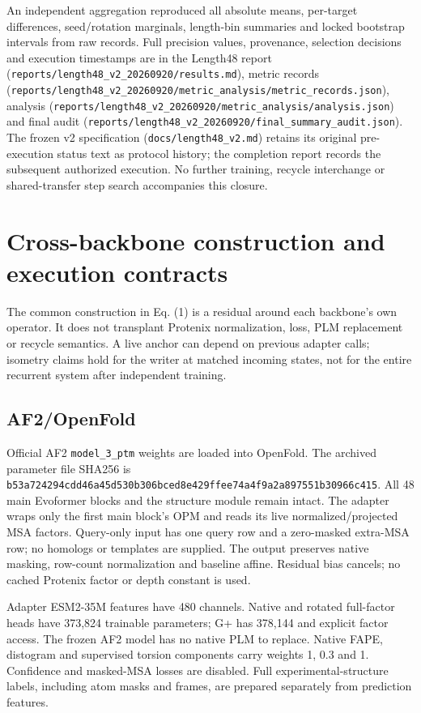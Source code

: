 An independent aggregation reproduced all absolute means, per-target differences,
seed/rotation marginals, length-bin summaries and locked bootstrap intervals from
raw records. Full precision values, provenance, selection decisions and execution
timestamps are in the Length48 report (\nolinkurl{reports/length48_v2_20260920/results.md}),
metric records (\nolinkurl{reports/length48_v2_20260920/metric_analysis/metric_records.json}),
analysis (\nolinkurl{reports/length48_v2_20260920/metric_analysis/analysis.json}) and
final audit (\nolinkurl{reports/length48_v2_20260920/final_summary_audit.json}).
The frozen v2 specification (\nolinkurl{docs/length48_v2.md}) retains its original
pre-execution status text as protocol history; the completion report records the
subsequent authorized execution. No further training, recycle interchange or
shared-transfer step search accompanies this closure.

\section{Cross-backbone construction and execution contracts}\label{cross-backbone-construction-and-execution-contracts}

The common construction in Eq. (1) is a residual around each backbone's own
operator. It does not transplant Protenix normalization, loss, PLM replacement
or recycle semantics. A live anchor can depend on previous adapter calls;
isometry claims hold for the writer at matched incoming states, not for the
entire recurrent system after independent training.

\subsection{AF2/OpenFold}\label{af2openfold}

Official AF2 \nolinkurl{model_3_ptm} weights are loaded into OpenFold. The archived parameter
file SHA256 is \nolinkurl{b53a724294cdd46a45d530b306bced8e429ffee74a4f9a2a897551b30966c415}.
All 48 main Evoformer blocks and the structure module remain intact. The adapter
wraps only the first main block's OPM and reads its live normalized/projected
MSA factors. Query-only input has one query row and a zero-masked extra-MSA row;
no homologs or templates are supplied. The output preserves native masking,
row-count normalization and baseline affine. Residual bias cancels; no cached
Protenix factor or depth constant is used.

Adapter ESM2-35M features have 480 channels. Native and rotated full-factor
heads have 373,824 trainable parameters; G+ has 378,144 and explicit factor access.
The frozen AF2 model has no native PLM to replace. Native FAPE, distogram and
supervised torsion components carry weights 1, 0.3 and 1. Confidence and
masked-MSA losses are disabled. Full experimental-structure labels, including
atom masks and frames, are prepared separately from prediction features.

